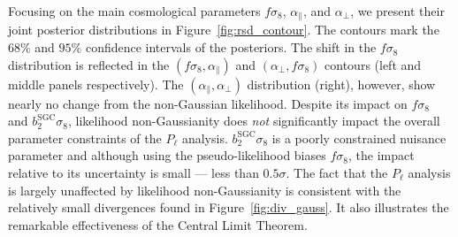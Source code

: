 \documentclass[12pt, letterpaper, preprint]{aastex}
\newcommand{\Beut}{\citetalias{beutler2017}\xspace}
\let\oldmarginpar\marginpar
\renewcommand\marginpar[1]{\-\oldmarginpar[\raggedleft\footnotesize #1]%
  {\raggedright\footnotesize #1}}
\newcommand{\todo}[1]{\marginpar{\color{red}TODO}{\color{red}#1}}
\begin{document}
Focusing on the main cosmological parameters $f \sigma_8$, 
$\alpha_\parallel$, and $\alpha_\perp$, we present their 
joint posterior distributions in Figure~\ref{fig:rsd_contour}.  
The contours mark the $68\%$ and $95\%$ confidence intervals
of the posteriors. The shift in the $f \sigma_8$ distribution 
is reflected in the
$(f\sigma_8, \alpha_\parallel)$ and $(\alpha_\perp, f\sigma_8)$ 
contours (left and middle panels respectively). The 
$(\alpha_\parallel, \alpha_\perp)$ distribution (right), however, show nearly 
no change from the non-Gaussian likelihood. %
Despite its impact on $f \sigma_8$ and $b_2^\mathrm{SGC} \sigma_8$, 
likelihood non-Gaussianity does \emph{not}
significantly impact the overall parameter constraints of the $P_\ell$ 
analysis. $b_2^\mathrm{SGC} \sigma_8$ is a poorly constrained nuisance 
parameter and although using the pseudo-likelihood biases $f \sigma_8$, 
the impact relative to its uncertainty is small --- less than $0.5 \sigma$. 
The fact that the $P_\ell$ analysis is largely unaffected by likelihood 
non-Gaussianity is consistent with the relatively small divergences found 
in Figure~\ref{fig:div_gauss}.
It also illustrates
the remarkable effectiveness of the Central Limit Theorem. %

\end{document}
